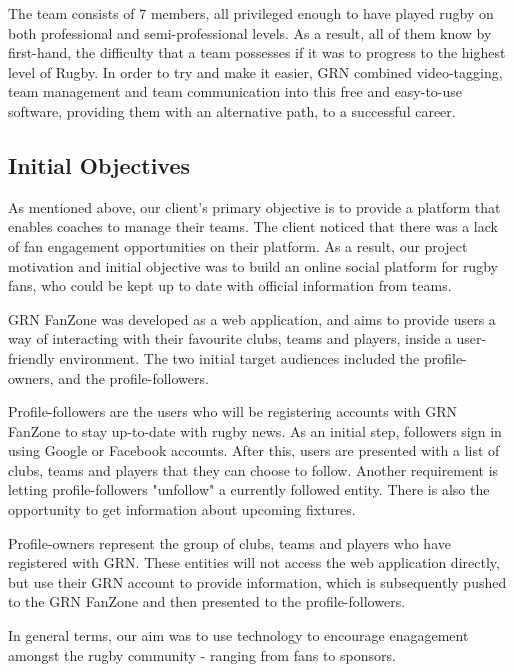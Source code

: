 \documentclass{l3proj}
\begin{document}
The team consists of 7 members, all privileged enough to have played rugby on both
professional and semi-professional levels. As a result, all of them know by first-hand, the
difficulty that a team possesses if it was to progress to the highest level of Rugby. In
order to try and make it easier, GRN combined video-tagging, team management and team
communication into this free and easy-to-use software, providing them with an alternative
path, to a successful career.


\subsection{Initial Objectives}
As mentioned above, our client's primary objective is to provide a platform that
 enables coaches to manage their teams.  The client noticed that there was a lack of
 fan engagement opportunities on their platform. As a result, our project motivation
 and initial objective was to build an online social platform for rugby fans, who could
 be kept up to date with official information from teams.

GRN FanZone was developed as a web application, and aims to provide users a way of
 interacting with their favourite clubs, teams and players, inside a user-friendly
 environment. The two initial target audiences included the profile-owners, and the
 profile-followers.

Profile-followers are the users who will be registering accounts with GRN FanZone to
 stay up-to-date with rugby news. As an initial step, followers sign in using Google or
 Facebook accounts. After this, users are presented with a list of clubs, teams and players
 that they can choose to follow. Another requirement is letting profile-followers "unfollow"
 a currently followed entity. There is also the opportunity to get information about
 upcoming fixtures.

Profile-owners represent the group of clubs, teams and players who have registered with
 GRN. These entities will not access the web application directly, but use their GRN account
 to provide information, which is subsequently pushed to the GRN FanZone and then presented
 to the profile-followers.

In general terms, our aim was to use technology to encourage enagagement amongst the
 rugby community - ranging from fans to sponsors.
\end{document}

